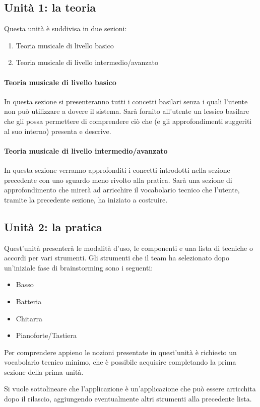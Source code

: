 \subsection{Unità 1: la teoria}
Questa unità è suddivisa in due sezioni:
\begin{enumerate}
	\item Teoria musicale di livello basico
	\item Teoria musicale di livello intermedio/avanzato
\end{enumerate}

\paragraph{Teoria musicale di livello basico} In questa sezione si presenteranno tutti i concetti basilari senza i quali l'utente non può utilizzare a dovere il sistema. Sarà fornito all'utente un lessico basilare che gli possa permettere di comprendere ciò che \ProjectTitle{} (e gli approfondimenti suggeriti al suo interno) presenta e descrive.
\paragraph{Teoria musicale di livello intermedio/avanzato} In questa sezione verranno approfonditi i concetti introdotti nella sezione precedente con uno sguardo meno rivolto alla pratica. Sarà una sezione di approfondimento che mirerà ad arricchire il vocabolario tecnico che l'utente, tramite la precedente sezione, ha iniziato a costruire.

\subsection{Unità 2: la pratica}
Quest'unità presenterà le modalità d'uso, le componenti e una lista di tecniche o accordi per vari strumenti. Gli strumenti che il team ha selezionato dopo un'iniziale fase di brainstorming sono i seguenti:
\begin{itemize}
	\item Basso
	\item Batteria
	\item Chitarra
	\item Pianoforte/Tastiera
\end{itemize}
Per comprendere appieno le nozioni presentate in quest'unità è richiesto un vocabolario tecnico minimo, che è possibile acquisire completando la prima sezione della prima unità.

Si vuole sottolineare che l'applicazione \ProjectTitle{} è un'applicazione che può essere arricchita dopo il rilascio, aggiungendo eventualmente altri strumenti alla precedente lista.

